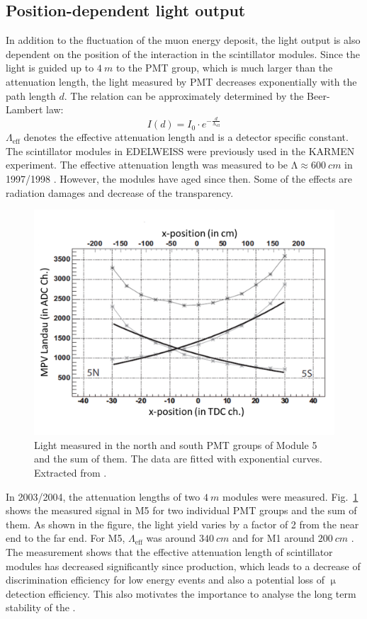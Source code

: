 \subsection{Position-dependent light output}
In addition to the fluctuation of the muon energy deposit, the light output is also dependent on the position of the interaction in the scintillator modules. Since the light is guided up to $\SI{4}{m}$ to the PMT group, which is much larger than the attenuation length, the light measured by PMT decreases exponentially with the path length $d$. The relation can be approximately determined by the Beer-Lambert law:
\begin{equation}
  I(d)=I_{0}\cdot e^{-\frac{d}{\mathrm{\Lambda}_{\mathrm{eff}}}}
\end{equation}
$\Lambda_{\mathrm{eff}}$ denotes the effective attenuation length and is a detector specific constant.
The scintillator modules in EDELWEISS were previously used in the KARMEN experiment. The effective attenuation length was measured to be $\mathrm{\Lambda} \approx \SI{600}{cm}$ in 1997/1998 \cite{Rei98}. However, the modules have aged since then. Some of the effects are radiation damages and decrease of the transparency.

\begin{figure}[ht!]
  \centering
  \includegraphics[width=0.6\textwidth{}]{./fig/pos-dependent.png}
  \caption{Light measured in the north and south PMT groups of Module 5 and the sum of them. The data are fitted with exponential curves. Extracted from \cite{Hab04}.}
  \label{fig:pos-dependent}
\end{figure}

In 2003/2004, the attenuation lengths of two $\SI{4}{m}$ modules were measured. Fig.\ \ref{fig:pos-dependent} shows the measured signal in M5 for two individual PMT groups and the sum of them. As shown in the figure, the light yield varies by a factor of 2 from the near end to the far end.
For M5, $\Lambda_{\mathrm{eff}}$ was around $\SI{340}{cm}$ and for M1 around $\SI{200}{cm}$ \cite{Hab04}. The measurement shows that the effective attenuation length of scintillator modules has decreased significantly since production, which leads to a decrease of discrimination efficiency for low energy events and also a potential loss of $\upmu$ detection efficiency. This also motivates the importance to analyse the long term stability of the \mvs{}.


